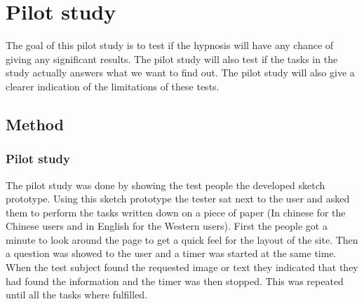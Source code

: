 
\chapter{Pilot study} %

\label{Pilotstudy} %

The goal of this pilot study is to test if the hypnosis will have any chance of giving any significant results. The pilot study will also test if the tasks in the study actually answers what we want to find out. The pilot study will also give a clearer indication of the limitations of these tests.
\section{Method}
\subsection{Pilot study}
The pilot study was done by showing the test people the developed sketch prototype. Using this sketch prototype the tester sat next to the user and asked them to perform the tasks written down on a piece of paper (In chinese for the Chinese users and in English for the Western users). First the people got a minute to look around the page to get a quick feel for the layout of the site. Then a question was showed to the user and a timer was started at the same time. When the test subject found the requested image or text they indicated that they had found the information and the timer was then stopped. This was repeated until all the tasks where fulfilled.

